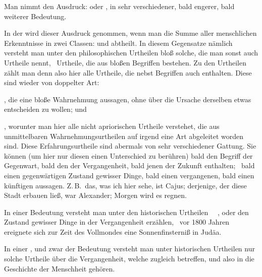 Man nimmt den Ausdruck:  oder , in sehr verschiedener, bald engerer, bald weiterer Bedeutung.
\begin{aufza}
\item In der  wird dieser Ausdruck genommen, wenn man die Summe aller menschlichen Erkenntnisse in zwei Classen:  und  abtheilt. In diesem Gegensatze nämlich versteht man unter den philosophischen Urtheilen bloß solche, die man sonst auch Urtheile  nennt, \dh\ Urtheile, die aus bloßen Begriffen bestehen. Zu den  Urtheilen zählt man denn also hier alle Urtheile, die nebst Begriffen auch  enthalten. Diese sind wieder von doppelter Art:
\begin{aufzb}
\item {}, die eine bloße Wahrnehmung aussagen, ohne über die Ursache derselben etwas entscheiden zu wollen; und
\item {}, worunter man hier alle nicht apriorischen Urtheile verstehet, die aus unmittelbaren Wahrnehmungsurtheilen auf irgend eine Art abgeleitet worden sind. Diese Erfahrungsurtheile sind abermals von sehr verschiedener Gattung. Sie können (um hier nur diesen einen Unterschied zu berühren) bald den Begriff der Gegenwart, bald den der Vergangenheit, bald jenen der Zukunft enthalten; \dh\ bald einen gegenwärtigen Zustand gewisser Dinge, bald einen vergangenen, bald einen künftigen aussagen. Z.\,B.\ das, was ich hier sehe, ist Cajus; derjenige, der diese Stadt erbauen ließ, war Alexander; Morgen wird es regnen.
\end{aufzb}
\item In einer  Bedeutung versteht man unter den historischen Urtheilen ~\ , oder den Zustand gewisser Dinge in der Vergangenheit erzählen, \zB\ vor 1800 Jahren ereignete sich zur Zeit des Vollmondes eine Sonnenfinsterniß in Judäa.
\item In einer , und zwar der  Bedeutung versteht man unter historischen Urtheilen nur solche Urtheile über die Vergangenheit, welche zugleich  betreffen, und also in die Geschichte der Menschheit gehören.

\end{aufza}
